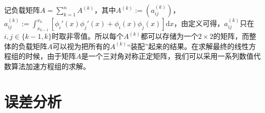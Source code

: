 \documentclass[lang=cn,10pt,newtx]{elegantbook}
\newcommand{\dif}{\mathrm{d}}
\begin{document}
记负载矩阵$A=\sum_{k=1}^{n}A^{(k)}$，其中$A^{(k)}:=(a_{ij}^{(k)})$，$a_{ij}^{(k)}:=\int_{x_{k-1}}^{x_{k}}[\phi_{i}'(x)\phi_{j}'(x)+\phi_{i}(x)\phi_{j}(x)]\dif x$，由定义可得，$a_{ij}^{(k)}$只在$i,j\in\{k-1,k\}$时取非零值。所以每个$A^{(k)}$都可以存储为一个$2\times 2$的矩阵，而整体的负载矩阵$A$可以视为把所有的$A^{(k)}$“装配”起来的结果。在求解最终的线性方程组的时候，由于矩阵$A$是一个三对角对称正定矩阵，我们可以采用一系列数值代数算法加速方程组的求解。
\section{误差分析}
\end{document}
